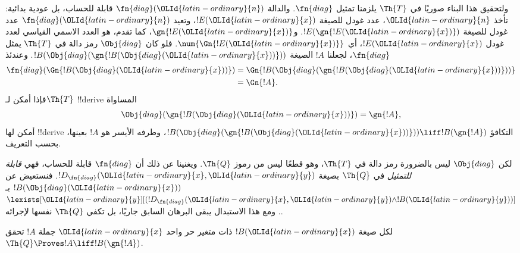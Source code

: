 \documentclass[../../../include/open-logic-section]{subfiles}
\begin{document}
\begin{explain}
ولتحقيق هذا البناء صوريًا في $\Th{T}$ يلزمنا تمثيل
$\fn{diag}$. والدالة $\fn{diag}(\OLId{latin-ordinary}{n})$ قابلة للحساب، بل عودية
بدائية: تأخذ $\OLId{latin-ordinary}{n}$، عدد غودل للصيغة $!E(\OLId{latin-ordinary}{x})$، وتعيد
$\fn{diag}(\OLId{latin-ordinary}{n})$ عدد غودل للصيغة $!E(\gn{!E(\OLId{latin-ordinary}{x})})$.
و$\gn{!E(\OLId{latin-ordinary}{x})}$، كما تقدم، هو العدد الاسمي القياسي لعدد غودل
$!E(\OLId{latin-ordinary}{x})$، أي $\num{\Gn{!E(\OLId{latin-ordinary}{x})}}$. فلو كان $\Obj{diag}$ رمز
دالة في $\Th{T}$ يمثل $\fn{diag}$، لجعلنا $!A$ الصيغة
$!B(\Obj{diag}(\gn{!B(\Obj{diag}(\OLId{latin-ordinary}{x}))}))$. وعندئذ
\begin{align*}
\fn{diag}(\Gn{!B(\Obj{diag}(\OLId{latin-ordinary}{x}))}) & =
\Gn{!B(\Obj{diag}(\gn{!B(\Obj{diag}(\OLId{latin-ordinary}{x}))}))} \\
& = \Gn{!A}.
\end{align*}
فإذا أمكن لـ$\Th{T}$ !!{derive} المساواة
\[
\Obj{diag}(\gn{!B(\Obj{diag}(\OLId{latin-ordinary}{x}))}) = \gn{!A},
\]
أمكن لها !!{derive} التكافؤ
$!B(\Obj{diag}(\gn{!B(\Obj{diag}(\OLId{latin-ordinary}{x}))}))\liff !B(\gn{!A})$،
وطرفه الأيسر هو $!A$ بعينها، بحسب التعريف.

لكن $\Obj{diag}$ ليس بالضرورة رمز دالة في $\Th{T}$،
وهو قطعًا ليس من رموز $\Th{Q}$. ويغنينا عن ذلك أن $\fn{diag}$
قابلة للحساب، فهي \emph{قابلة للتمثيل} في $\Th{Q}$ بصيغة
$!D_{\fn{diag}}(\OLId{latin-ordinary}{x},\OLId{latin-ordinary}{y})$. فنستعيض عن $!B(\Obj{diag}(\OLId{latin-ordinary}{x}))$
بـ$\lexists[\OLId{latin-ordinary}{y}][(!D_{\fn{diag}}(\OLId{latin-ordinary}{x},\OLId{latin-ordinary}{y})\land !B(\OLId{latin-ordinary}{y}))]$.
ومع هذا الاستبدال يبقى البرهان السابق جاريًا، بل تكفي
$\Th{Q}$ نفسها لإجرائه.
\end{explain}

\begin{lem}
 لكل صيغة $!B(\OLId{latin-ordinary}{x})$ ذات متغير حر واحد
$\OLId{latin-ordinary}{x}$ جملة $!A$ تحقق
$\Th{Q}\Proves !A\liff !B(\gn{!A})$.
\end{lem}
\end{document}
